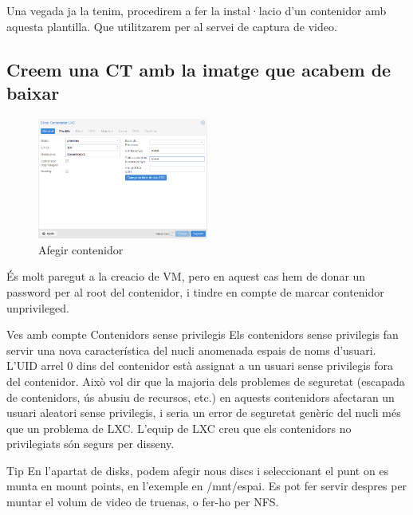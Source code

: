 \documentclass[
  10pt,
]{krantz}
\begin{document}
Una vegada ja la tenim, procedirem a fer la instal·lacio d'un contenidor amb aquesta plantilla. Que utilitzarem per al servei de captura de video.

\hypertarget{creem-una-ct-amb-la-imatge-que-acabem-de-baixar}{%
\subsection{Creem una CT amb la imatge que acabem de baixar}\label{creem-una-ct-amb-la-imatge-que-acabem-de-baixar}}

\begin{figure}
\centering
\includegraphics[width=0.5\textwidth,height=\textheight]{imatges/proxmox/Contenidor1.png}
\caption{Afegir contenidor}
\end{figure}

És molt paregut a la creacio de VM, pero en aquest cas hem de donar un password per al root del contenidor, i tindre en compte de marcar contenidor unprivileged.

\begin{rmdcuidao}{Ves amb compte}
Contenidors sense privilegis Els contenidors sense privilegis fan servir una nova característica del nucli anomenada espais de noms d'usuari. L'UID arrel 0 dins del contenidor està assignat a un usuari sense privilegis fora del contenidor. Això vol dir que la majoria dels problemes de seguretat (escapada de contenidors, ús abusiu de recursos, etc.) en aquests contenidors afectaran un usuari aleatori sense privilegis, i seria un error de seguretat genèric del nucli més que un problema de LXC. L'equip de LXC creu que els contenidors no privilegiats són segurs per disseny.

\end{rmdcuidao}

\begin{rmdtip}{Tip}
En l'apartat de disks, podem afegir nous discs i seleccionant el punt on es munta en mount points, en l'exemple en /mnt/espai. Es pot fer servir despres per muntar el volum de video de truenas, o fer-ho per NFS.

\end{rmdtip}
\end{document}
